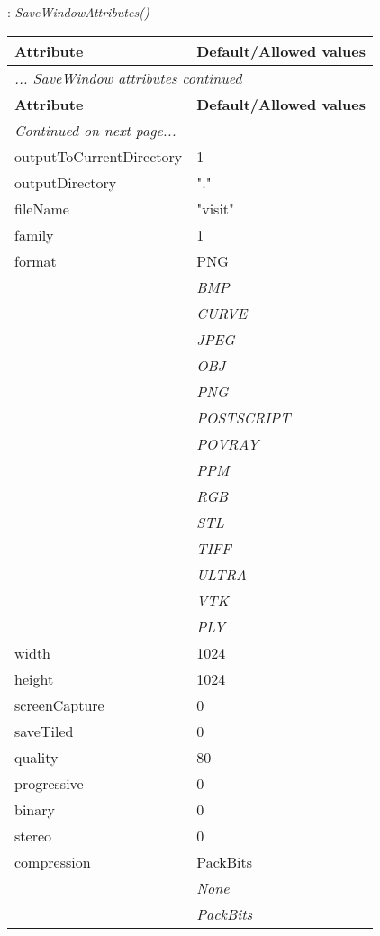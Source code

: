 \documentclass[10pt,a4paper]{report}
\begin{document}
\newpage

{}
: {\it SaveWindowAttributes() }\\[-3mm]

\begin{longtable}{ll}
{\bf Attribute} & {\bf Default/Allowed values} \\
\hline \hline
\endfirsthead
\multicolumn{2}{l}{{\it ... SaveWindow attributes continued}} \\
{\bf Attribute} & {\bf Default/Allowed values} \\
\hline \hline
\endhead
\hline
\multicolumn{2}{l}{{\it Continued on next page...}} \\
\endfoot
\hline
\endlastfoot

outputToCurrentDirectory  &  1 \\
outputDirectory  &  "." \\
fileName  &  "visit" \\
family  &  1 \\
format  &  PNG   \\
 & {\it  BMP} \\
 & {\it  CURVE} \\
 & {\it  JPEG} \\
 & {\it  OBJ} \\
 & {\it  PNG} \\
 & {\it  POSTSCRIPT} \\
 & {\it  POVRAY} \\
 & {\it  PPM} \\
 & {\it  RGB} \\
 & {\it  STL} \\
 & {\it  TIFF} \\
 & {\it  ULTRA} \\
 & {\it  VTK} \\
 & {\it  PLY} \\
width  &  1024 \\
height  &  1024 \\
screenCapture  &  0 \\
saveTiled  &  0 \\
quality  &  80 \\
progressive  &  0 \\
binary  &  0 \\
stereo  &  0 \\
compression  &  PackBits   \\
 & {\it  None} \\
 & {\it  PackBits} \\

\end{longtable}
\end{document}
